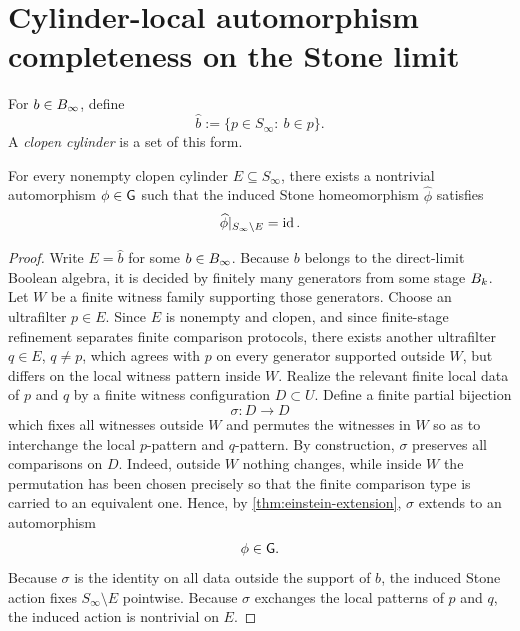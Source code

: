\section{Cylinder-local automorphism completeness on the Stone limit}
\label{sec:einstein-cylinder}
\begin{definition}
	For \(b\in B_\infty\), define
	\[
		\widehat b:=\{p\in S_\infty:\ b\in p\}.
	\]
	A \emph{clopen cylinder} is a set of this form.
\end{definition}
\begin{theorem}
	\label{thm:einstein-cylinder}
	For every nonempty clopen cylinder \(E\subseteq S_\infty\), there
	exists a nontrivial automorphism \(\phi\in\mathsf G\) such that the induced
	Stone homeomorphism \(\widehat\phi\) satisfies
	\[
		\widehat\phi|_{S_\infty\setminus E}=\operatorname{id}.
	\]
\end{theorem}
\begin{proof}
	Write \(E=\widehat b\) for some \(b\in B_\infty\).
	Because \(b\) belongs to the direct-limit Boolean algebra, it is
	decided by finitely many generators from some stage \(B_k\).
	Let \(W\) be a finite witness family supporting those generators.
	Choose an ultrafilter \(p\in E\).
	Since \(E\) is nonempty and clopen, and since finite-stage refinement
	separates finite comparison protocols, there exists another ultrafilter
	\(q\in E\), \(q\neq p\), which agrees with \(p\) on every generator
	supported outside \(W\), but differs on the local witness pattern
	inside \(W\).
	Realize the relevant finite local data of \(p\) and \(q\) by a finite
	witness configuration \(D\subset U\).
	Define a finite partial bijection
	\[
		\sigma:D\to D
	\]
	which fixes all witnesses outside \(W\) and permutes the witnesses in
	\(W\) so as to interchange the local \(p\)-pattern and \(q\)-pattern.
	By construction, \(\sigma\) preserves all comparisons on \(D\).
	Indeed, outside \(W\) nothing changes, while inside \(W\) the
	permutation has been chosen precisely so that the finite comparison
	type is carried to an equivalent one.
	Hence, by \cref{thm:einstein-extension}, \(\sigma\) extends to an
	automorphism
	\[
		\phi\in\mathsf G.
	\]
	Because \(\sigma\) is the identity on all data outside the support of
	\(b\), the induced Stone action fixes \(S_\infty\setminus E\)
	pointwise.
	Because \(\sigma\) exchanges the local patterns of \(p\) and \(q\), the
	induced action is nontrivial on \(E\).
\end{proof}
